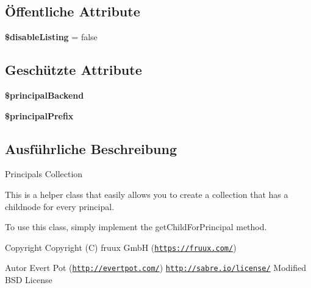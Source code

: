 \subsection*{Öffentliche Attribute}
\begin{DoxyCompactItemize}
\item 
\mbox{\label{class_sabre_1_1_d_a_v_a_c_l_1_1_abstract_principal_collection_ad2c5d62f686804897da8894229eed1a6}} 
{\bfseries \$disable\+Listing} = false
\end{DoxyCompactItemize}
\subsection*{Geschützte Attribute}
\begin{DoxyCompactItemize}
\item 
\mbox{\label{class_sabre_1_1_d_a_v_a_c_l_1_1_abstract_principal_collection_a1b05c84d2f291c94068341f284561f83}} 
{\bfseries \$principal\+Backend}
\item 
\mbox{\label{class_sabre_1_1_d_a_v_a_c_l_1_1_abstract_principal_collection_a8ad8a47a917ee4a7d61ac38bd94e1c5b}} 
{\bfseries \$principal\+Prefix}
\end{DoxyCompactItemize}


\subsection{Ausführliche Beschreibung}
Principals Collection

This is a helper class that easily allows you to create a collection that has a childnode for every principal.

To use this class, simply implement the get\+Child\+For\+Principal method.

\begin{DoxyCopyright}{Copyright}
Copyright (C) fruux GmbH (\href{https://fruux.com/}{\tt https\+://fruux.\+com/}) 
\end{DoxyCopyright}
\begin{DoxyAuthor}{Autor}
Evert Pot (\href{http://evertpot.com/}{\tt http\+://evertpot.\+com/})  \href{http://sabre.io/license/}{\tt http\+://sabre.\+io/license/} Modified B\+SD License 
\end{DoxyAuthor}


